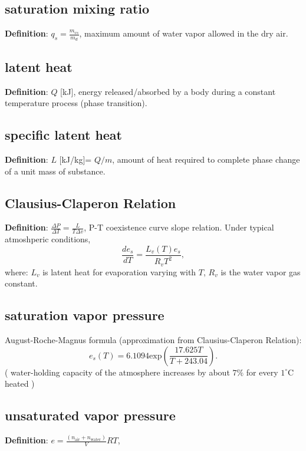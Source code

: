 \subsection{saturation mixing ratio}
{\bf Definition}: $ q_s = \frac{m_{vs}}{m_d}$, maximum amount of water vapor allowed in the dry air.

\subsection{latent heat}
{\bf Definition}: $Q$ [kJ], energy released/absorbed by a body during a constant temperature process
(phase transition).

\subsection{specific latent heat}
{\bf Definition}: $L$ [kJ/kg]= $Q/m$, amount of heat required to complete phase change of a unit
mass of substance.

\subsection{Clausius-Claperon Relation}
{\bf Definition}: $\frac{\Delta P}{\Delta T} = \frac{L}{T\Delta v}$, P-T coexistence curve slope
relation. Under typical atmoshperic conditions, 
\begin{equation}
   \frac{d e_s}{dT} = \frac{L_v(T)e_s}{R_vT^2}, 
\end{equation}
where: $L_v$ is latent heat for evaporation varying with $T$, $R_v$ is the water vapor gas constant.
\\


\subsection{saturation vapor pressure}
August-Roche-Magnus formula (approximation from Clausius-Claperon Relation): \\
\begin{equation}
   e_s(T) = 6.1094 \text{exp}(\frac{17.625T}{T+243.04}).
\end{equation}
( water-holding capacity of the atmosphere increases by about $7\%$ for every $1^{\circ}$C heated )

\subsection{unsaturated vapor pressure}
{\bf Definition}: $e = \frac{(n_{\text{air}} + n_{\text{water}})}{V}RT$, 

